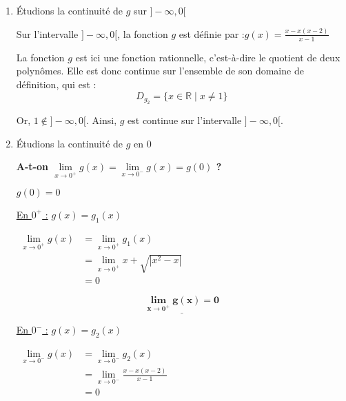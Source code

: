 \documentclass[12pt,a4paper]{article}
\begin{document}
\begin{enumerate}
Par somme de fonctions continues, on en déduit que $g$ est continue sur $[0, +\infty[$.

                    
    \item Étudions la continuité de \( g \) sur \( ]-\infty, 0[ \)

Sur l'intervalle $]-\infty, 0[$, la fonction $g$ est définie par :\( g(x) = \frac{x - x(x - 2)}{x - 1} \)

La fonction $g$ est ici une fonction rationnelle, c’est-à-dire le quotient de deux polynômes. Elle est donc continue sur l’ensemble de son domaine de définition, qui est :
\[
D_{g_2} = \{x \in \mathbb{R} \mid x \ne 1\}
\]

Or, \( 1 \notin ]-\infty, 0[ \). Ainsi, \( g \) est continue sur l’intervalle \( ]-\infty, 0[ \).


    \item Étudions  la continuité de \( g \) en \( 0 \)

\textbf{A-t-on $ \lim\limits_{x \to 0^{+}}g(x) = \lim\limits_{x \to 0^{-}}g(x) = g(0) $ ?}

\textbf{$g(0)=0$ }   
    
    \underline{En $0^{+}$ :} $g(x) = g_{1}(x)$

										\(
									\begin{aligned}
											\lim\limits_{x \to 0^{+}}g(x) &= \lim\limits_{x \to 0^{+}}g_{1}(x)\\
																											&= \lim\limits_{x \to 0^{+}}x + \sqrt{|x^2 - x|}\\
																											&=0
									\end{aligned}
									\)    
 
										\begin{resultbox}
                        \[
                            \mathbf{ \underline{\lim\limits_{x \to 0^{+}}g(x) = 0} }
                        \]
                    \end{resultbox}       

\underline{En $0^{-}$ :} $g(x) = g_{2}(x)$

										\(
									\begin{aligned}
											\lim\limits_{x \to 0^{-}}g(x) &= \lim\limits_{x \to 0^{-}}g_{2}(x)\\
																											&= \lim\limits_{x \to 0^{-}}\frac{x - x(x-2)}{x - 1}\\
																											&=0
									\end{aligned}
									\)    


\end{enumerate}
\end{document}
